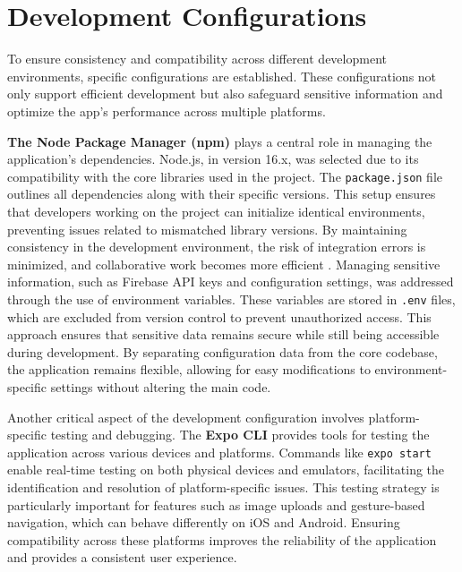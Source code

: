 \section{Development Configurations}
To ensure consistency and compatibility across different development environments, specific configurations are established. These configurations not only support efficient development but also safeguard sensitive information and optimize the app's performance across multiple platforms.

\textbf{The Node Package Manager (npm)} plays a central role in managing the application’s dependencies. Node.js, in version 16.x, was selected due to its compatibility with the core libraries used in the project. The \texttt{package.json} file outlines all dependencies along with their specific versions. This setup ensures that developers working on the project can initialize identical environments, preventing issues related to mismatched library versions. By maintaining consistency in the development environment, the risk of integration errors is minimized, and collaborative work becomes more efficient \cite{nodeessentials} \cite{nodecompleteguide}.
Managing sensitive information, such as Firebase API keys and configuration settings, was addressed through the use of environment variables. These variables are stored in \texttt{.env} files, which are excluded from version control to prevent unauthorized access. This approach ensures that sensitive data remains secure while still being accessible during development. By separating configuration data from the core codebase, the application remains flexible, allowing for easy modifications to environment-specific settings without altering the main code.

Another critical aspect of the development configuration involves platform-specific testing and debugging. The \textbf{Expo CLI} provides tools for testing the application across various devices and platforms. Commands like \texttt{expo start} enable real-time testing on both physical devices and emulators, facilitating the identification and resolution of platform-specific issues. This testing strategy is particularly important for features such as image uploads and gesture-based navigation, which can behave differently on iOS and Android. Ensuring compatibility across these platforms improves the reliability of the application and provides a consistent user experience.


